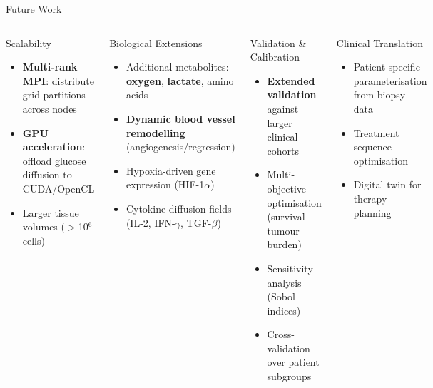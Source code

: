 \documentclass[aspectratio=169,10pt]{beamer}
\begin{document}
\begin{frame}{Future Work}
  \begin{columns}[T]
    \begin{block}{Scalability}
      \begin{itemize}
        \item \textbf{Multi-rank MPI}: distribute grid partitions across nodes
        \item \textbf{GPU acceleration}: offload glucose diffusion to CUDA/OpenCL
        \item Larger tissue volumes ($>$10$^6$ cells)
      \end{itemize}
    \end{block}

    \begin{block}{Biological Extensions}
      \begin{itemize}
        \item Additional metabolites: \textbf{oxygen}, \textbf{lactate}, amino acids
        \item \textbf{Dynamic blood vessel remodelling} (angiogenesis/regression)
        \item Hypoxia-driven gene expression (HIF-1$\alpha$)
        \item Cytokine diffusion fields (IL-2, IFN-$\gamma$, TGF-$\beta$)
      \end{itemize}
    \end{block}

    \begin{block}{Validation \& Calibration}
      \begin{itemize}
        \item \textbf{Extended validation} against larger clinical cohorts
        \item Multi-objective optimisation (survival + tumour burden)
        \item Sensitivity analysis (Sobol indices)
        \item Cross-validation over patient subgroups
      \end{itemize}
    \end{block}

    \begin{block}{Clinical Translation}
      \begin{itemize}
        \item Patient-specific parameterisation from biopsy data
        \item Treatment sequence optimisation
        \item Digital twin for therapy planning
      \end{itemize}
    \end{block}
  \end{columns}
\end{frame}

\end{document}
